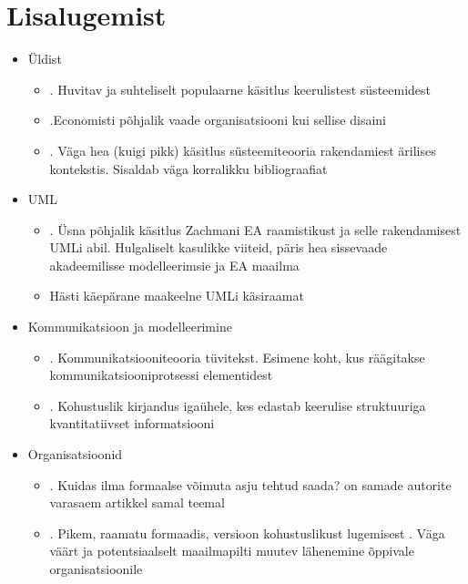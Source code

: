 \documentclass[nobib]{tufte-handout}
\begin{document}
\section{Lisalugemist}
\begin{itemize}
	\item Üldist
	\begin{itemize}	
		\item \cite{simon1996sciences}. Huvitav ja suhteliselt populaarne käsitlus keerulistest süsteemidest 
		\item \cite{stanford2005guide}.Economisti põhjalik vaade organisatsiooni kui sellise disaini
		\item \cite{checkland2000soft}. Väga hea (kuigi pikk) käsitlus süsteemiteooria rakendamiest ärilises kontekstis. Sisaldab väga korralikku bibliograafiat
	\end{itemize}
	\item UML
	\begin{itemize}
		\item \cite{fatolahi2006investigation}. Üsna põhjalik käsitlus Zachmani EA raamistikust ja selle rakendamisest UMLi abil. Hulgaliselt kasulikke viiteid, päris hea sissevaade akadeemilisse modelleerimsie ja EA maailma
		\item \cite{umldistilled} Hästi käepärane maakeelne UMLi käsiraamat
	\end{itemize}
	\item Kommunikatsioon ja modelleerimine
	\begin{itemize}
		\item \cite{shannon2001mathematical}. Kommunikatsiooniteooria tüvitekst. Esimene koht, kus räägitakse kommunikatsiooniprotsessi elementidest
		\item \cite{tufte}. Kohustuslik kirjandus igaühele, kes edastab keerulise struktuuriga kvantitatiivset informatsiooni
	\end{itemize}
	\item Organisatsioonid
	\begin{itemize}
		\item \cite{cohen2007influence}. Kuidas ilma formaalse võimuta asju tehtud saada? \cite{cohen1989influence} on samade autorite varasaem artikkel samal teemal
		\item \cite{senge2006fifth}. Pikem, raamatu formaadis, versioon kohustuslikust lugemisest \cite{senge2002leader}. Väga väärt ja potentsiaalselt maailmapilti muutev lähenemine õppivale organisatsioonile

\end{itemize}
\end{itemize}
\end{document}
